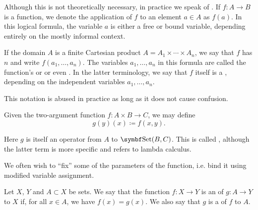\begin{definition}\label{def:function_arguments}
  Although this is not theoretically necessary, in practice we speak of . If \( f: A \to B \) is a function, we denote the application of \( f \) to an element \( a \in A \) as \( f(a) \). In this logical formula, the variable \( a \) is either a free or bound variable, depending entirely on the mostly informal context.

  If the domain \( A \) is a finite Cartesian product \( A = A_1 \times \cdots \times A_n \), we say that \( f \) has  \( n \) and write \( f(a_1, \ldots, a_n) \). The variables \( a_1, \ldots, a_n \) in this formula are called the function's  or  or even . In the latter terminology, we say that \( f \) itself is a , depending on the independent variables \( a_1, \ldots, a_n \).

  This notation is abused in practice as long as it does not cause confusion.

  Given the two-argument function \( f: A \times B \to C \), we may define
  \begin{equation*}
    g(y)(x) \coloneqq f(x, y).
  \end{equation*}

  Here \( g \) is itself an operator from \( A \) to \( \Cat{Set}(B, C) \). This is called , although the latter term is more specific and refers to lambda calculus.

  We often wish to \enquote{fix} some of the parameters of the function, i.e. bind it using modified variable assignment.
\end{definition}

\begin{definition}\label{def:function_extension}
  Let \( X \), \( Y \) and \( A \subset X \) be sets. We say that the function \( f: X \to Y \) is an  of \( g: A \to Y \) to \( X \) if, for all \( x \in A \), we have \( f(x) = g(x) \). We also say that \( g \) is a  of \( f \) to \( A \).
\end{definition}

